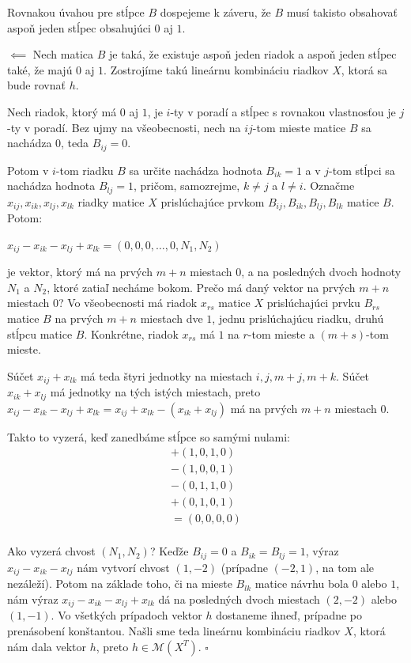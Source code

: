 \begin{dokaz}
Rovnakou úvahou pre stĺpce $B$ dospejeme k záveru,
že $B$ musí takisto obsahovať aspoň jeden stĺpec obsahujúci $0$ aj $1$.

$\boxed{\impliedby}$ Nech matica $B$ je taká, že existuje aspoň jeden riadok a aspoň jeden stĺpec také, že majú $0$ aj $1$.
Zostrojíme takú lineárnu kombináciu riadkov $X$, ktorá sa bude rovnať $h$.

Nech riadok, ktorý má $0$ aj $1$, je $i$-ty v poradí a stĺpec s rovnakou vlastnosťou je $j$-ty v poradí.
Bez ujmy na všeobecnosti, nech na $ij$-tom mieste matice $B$ sa nachádza $0$, teda $B_{ij} = 0$.

Potom v $i$-tom riadku $B$ sa určite nachádza hodnota $B_{ik} = 1$ a v $j$-tom stĺpci sa nachádza hodnota $B_{lj} = 1$,
pričom, samozrejme, $k \neq j$ a $l \neq i$.
Označme $x_{ij}, x_{ik}, x_{lj}, x_{lk}$ riadky matice $X$ prislúchajúce prvkom $B_{ij}, B_{ik}, B_{lj}, B_{lk}$ matice $B$. Potom:

\begin{center}
$
x_{ij} - x_{ik} - x_{lj} + x_{lk} = (0, 0, 0, \ldots, 0, N_1, N_2)
$
\end{center}
je vektor, ktorý má na prvých $m + n$ miestach $0$, a na posledných dvoch hodnoty $N_1$ a $N_2$, ktoré zatiaľ necháme bokom.
Prečo má daný vektor na prvých $m + n$ miestach $0$?
Vo všeobecnosti má riadok $x_{rs}$ matice $X$ prislúchajúci prvku $B_{rs}$ matice $B$ na prvých $m + n$ miestach dve $1$,
jednu prislúchajúcu riadku, druhú stĺpcu matice $B$. Konkrétne, riadok $x_{rs}$ má $1$ na $r$-tom mieste a $(m + s)$-tom mieste.

Súčet $x_{ij} + x_{lk}$ má teda štyri jednotky na miestach $i, j, m + j, m + k$.
Súčet $x_{ik} + x_{lj}$ má jednotky na tých istých miestach, 
preto $x_{ij} - x_{ik} - x_{lj} + x_{lk} = x_{ij} + x_{lk} - (x_{ik} + x_{lj})$ má na prvých $m + n$ miestach $0$.

Takto to vyzerá, keď zanedbáme stĺpce so samými nulami:
\[
\begin{split}
+(1, 0, 1, 0) \\
-(1, 0, 0, 1) \\
-(0, 1, 1, 0) \\
+(0, 1, 0, 1) \\
=(0, 0, 0, 0) \\
\end{split}
\]

Ako vyzerá chvost $(N_1, N_2)$? Keďže $B_{ij} = 0$ a $B_{ik} = B_{lj} = 1$,
výraz $x_{ij} - x_{ik} - x_{lj}$ nám vytvorí chvost $(1, -2)$ (prípadne $(-2, 1)$, na tom ale nezáleží).
Potom na základe toho, či na mieste $B_{lk}$ matice návrhu bola $0$ alebo $1$,
nám výraz $x_{ij} - x_{ik} - x_{lj} + x_{lk}$ dá na posledných dvoch miestach $(2, -2)$ alebo $(1, -1)$.
Vo všetkých prípadoch vektor $h$ dostaneme ihneď, prípadne po prenásobení konštantou.
Našli sme teda lineárnu kombináciu riadkov $X$, ktorá nám dala vektor $h$, preto $h \in \mathcal{M}(X^T)$. $\square$

\end{dokaz}

